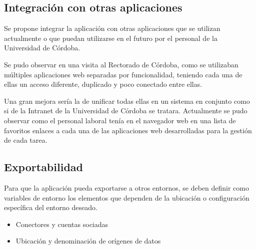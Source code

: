\subsection{Integración con otras aplicaciones}
Se propone integrar la aplicación con otras aplicaciones que se utilizan actualmente o que puedan utilizarse en el futuro por el personal de la Universidad de Córdoba.

Se pudo observar en una visita al Rectorado de Córdoba, como se utilizaban múltiples aplicaciones web separadas por funcionalidad, teniendo cada una de ellas un acceso diferente, duplicado y poco conectado entre ellas.

Una gran mejora sería la de unificar todas ellas en un sistema en conjunto como si de la Intranet de la Universidad de Córdoba se tratara. Actualmente se pudo observar como el personal laboral tenía en el navegador web en una lista de favoritos enlaces a cada una de las aplicaciones web desarrolladas para la gestión de cada tarea.

\subsection{Exportabilidad}
Para que la aplicación pueda exportarse a otros entornos, se deben definir como variables de entorno los elementos que dependen de la ubicación o configuración específica del entorno deseado.

\begin{itemize}
    \item Conectores y cuentas sociadas
    \item Ubicación y denominación de orígenes de datos
\end{itemize}
